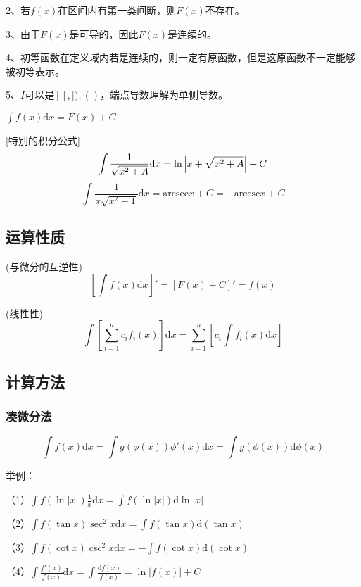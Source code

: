 \documentclass{SCIS2020cn}
\begin{document}
2、若$f(x)$在区间内有第一类间断，则$F(x)$不存在。

3、由于$F(x)$是可导的，因此$F(x)$是连续的。

4、初等函数在定义域内若是连续的，则一定有原函数，但是这原函数不一定能够被初等表示。

5、$I$可以是$[ ],[ ),( )$，端点导数理解为单侧导数。
\begin{definition}[不定积分]\label{def2}
$\displaystyle\int{}f(x)\text{d}x=F(x)+C$
\end{definition}
[特别的积分公式]
\begin{equation}
\int{\frac{1}{\sqrt{x^2+A}}}\text{d}x=\ln{\ensuremath{\left| x+\sqrt{x^2+A} \right|}}+C
\end{equation}
\begin{equation}
\int{\frac{1}{x\sqrt{x^2-1}}}\text{d}x=\text{arcsec}x+C=-\text{arccsc}x+C
\end{equation}
\subsection{运算性质}
(与微分的互逆性)
\begin{equation}
\left[\int{f(x)\text{d}x}\right]'=[F(x)+C]'=f(x)
\end{equation}

(线性性)
\begin{equation}
\int{\left[\sum_{i=1}^nc_if_i(x)\right]\text{d}x}=\sum_{i=1}^n\left[c_i\int{f_i(x)\text{d}x}\right]
\end{equation}
\subsection{计算方法}
\subsubsection{凑微分法}
\begin{equation}
\int{f(x)\text{d}x}=\int{g(\phi(x))\phi'(x)\text{d}x}=\int{g(\phi(x))\text{d}\phi(x)}
\end{equation}

举例：

（1）$\displaystyle\int{f(\ln{|x|})\frac{1}{x}}\text{d}x=\int{f(\ln{|x|})}\text{d}\ln{|x|}$

（2）$\displaystyle\int{f(\tan{x})\sec^2x\text{d}x}=\int{f(\tan{x})\text{d}(\tan{x})}$

（3）$\displaystyle\int{f(\cot{x})\csc^2x\text{d}x}=-\int{f(\cot{x})\text{d}(\cot{x})}$

（4）$\displaystyle\int{\frac{f'(x)}{f(x)}\text{d}x}=\int{\frac{\text{d}f(x)}{f(x)}}=\ln{|f(x)|}+C$
\end{document}
